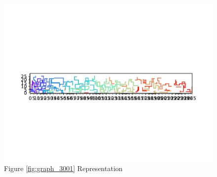 \documentclass{standalone}
\begin{document}
\begin{figure}[!htb]
	\caption{Figure \ref{fig:graph_3001} Representation}
	\label{fig:picture_3001}
	\includegraphics[width=\textwidth]{../graphs/picture/3001.pdf}
\end{figure}
\end{document}
